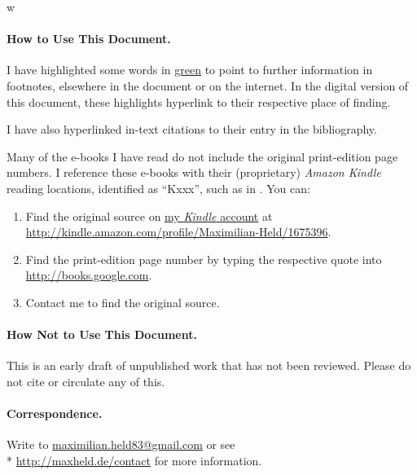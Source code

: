 w%
\paragraph{How to Use This Document.}
I have highlighted some words in \href{chap:how2}{green} to point to further information in footnotes, elsewhere in the document or on the internet.
In the digital version of this document, these highlights hyperlink to their respective place of finding.

I have also hyperlinked in-text citations to their entry in the bibliography.

Many of the e-books I have read do not include the original print-edition page numbers.
I reference these e-books with their (proprietary) \emph{Amazon Kindle} reading locations, identified as ``Kxxx'', such as in \citet[K50]{McCaffery2002}. %
You can:

\begin{enumerate}
	\item Find the original source on \href{http://kindle.amazon.com/profile/Maximilian-Held/1675396}{my \emph{Kindle} account} at\\ \url{http://kindle.amazon.com/profile/Maximilian-Held/1675396}.

	\item Find the print-edition page number by typing the respective quote into \url{http://books.google.com}.

	\item Contact me to find the original source.
\end{enumerate}

\paragraph{How Not to Use This Document.}
This is an early draft of unpublished work that has not been reviewed. Please do not cite or circulate any of this.

\paragraph{Correspondence.}
Write to \href{mailto:maximilian.held83@gmail.com}{maximilian.held83@gmail.com} or see \\* \url{http://maxheld.de/contact} for more information.
